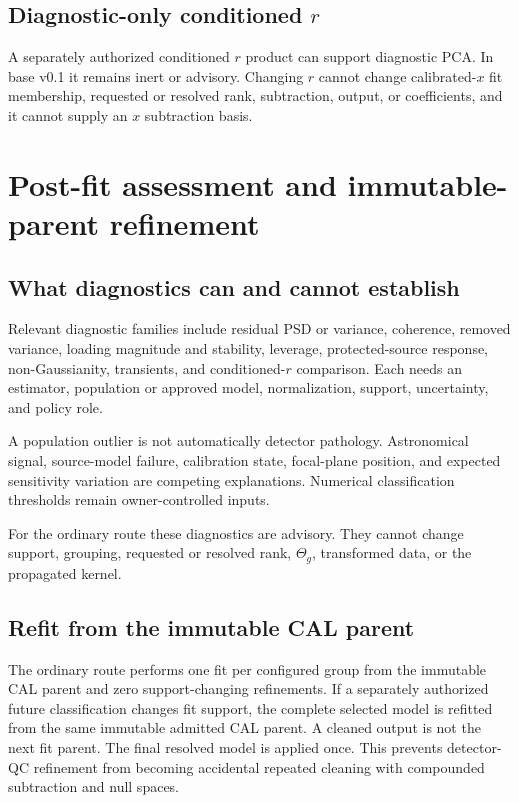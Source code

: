 \documentclass[11pt]{article}
\begin{document}
\subsection{Diagnostic-only conditioned \(r\)}

A separately authorized conditioned $r$ product can support diagnostic PCA.
In base v0.1 it remains inert or advisory. Changing $r$ cannot change
calibrated-$x$ fit membership, requested or resolved rank, subtraction,
output, or coefficients, and it
cannot supply an $x$ subtraction basis.

\section{Post-fit assessment and immutable-parent refinement}
\label{sec:science-refinement}

\subsection{What diagnostics can and cannot establish}

Relevant diagnostic families include residual PSD or variance, coherence,
removed variance, loading magnitude and stability, leverage, protected-source
response, non-Gaussianity, transients, and conditioned-$r$ comparison. Each
needs an estimator, population or approved model, normalization, support,
uncertainty, and policy role.

A population outlier is not automatically detector pathology. Astronomical
signal, source-model failure, calibration state, focal-plane position, and
expected sensitivity variation are competing explanations. Numerical
classification thresholds remain owner-controlled inputs.

For the ordinary route these diagnostics are advisory. They cannot change
support, grouping, requested or resolved rank, $\Theta_g$, transformed data,
or the propagated kernel.

\subsection{Refit from the immutable CAL parent}

The ordinary route performs one fit per configured group from the immutable
CAL parent and zero support-changing refinements. If a separately authorized
future classification changes fit support, the complete selected model is
refitted from the same immutable admitted CAL parent. A cleaned output is not
the next fit parent. The final resolved model is applied once. This prevents
detector-QC refinement from becoming accidental repeated cleaning with
compounded subtraction and null spaces.
\end{document}
